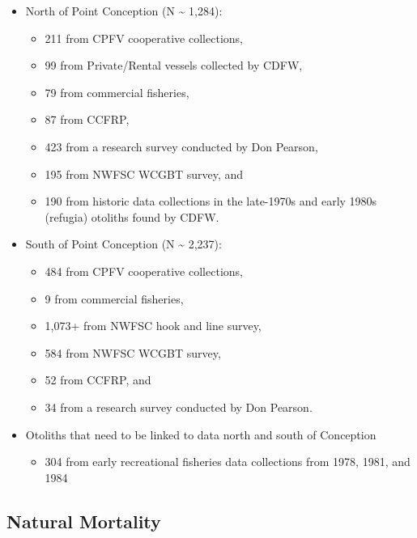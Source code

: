 \documentclass[
]{article}
\providecommand{\tightlist}{%
  \setlength{\itemsep}{0pt}\setlength{\parskip}{0pt}}
\begin{document}
\begin{itemize}
\tightlist
\item
  North of Point Conception (N \textasciitilde{} 1,284):

  \begin{itemize}
  \tightlist
  \item
    211 from CPFV cooperative collections,
  \item
    99 from Private/Rental vessels collected by CDFW,
  \item
    79 from commercial fisheries,
  \item
    87 from CCFRP,
  \item
    423 from a research survey conducted by Don Pearson,
  \item
    195 from NWFSC WCGBT survey, and
  \item
    190 from historic data collections in the late-1970s and early 1980s
    (refugia) otoliths found by CDFW.
  \end{itemize}
\item
  South of Point Conception (N \textasciitilde{} 2,237):

  \begin{itemize}
  \tightlist
  \item
    484 from CPFV cooperative collections,
  \item
    9 from commercial fisheries,
  \item
    1,073+ from NWFSC hook and line survey,
  \item
    584 from NWFSC WCGBT survey,
  \item
    52 from CCFRP, and
  \item
    34 from a research survey conducted by Don Pearson.
  \end{itemize}
\item
  Otoliths that need to be linked to data north and south of Conception

  \begin{itemize}
  \tightlist
  \item
    304 from early recreational fisheries data collections from 1978,
    1981, and 1984
  \end{itemize}
\end{itemize}

\hypertarget{natural-mortality}{%
\subsection{Natural Mortality}\label{natural-mortality}}
\end{document}
